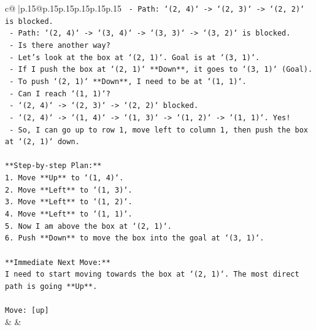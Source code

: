 \documentclass{article}
\begin{document}
{\begin{supertabular}{c@{$\;$}|p{.15\linewidth}@{}p{.15\linewidth}p{.15\linewidth}p{.15\linewidth}p{.15\linewidth}p{.15\linewidth}}
{{{\texttt{    {-} Path: `(2, 4)` {-}> `(2, 3)` {-}> `(2, 2)` is blocked.} \\
\texttt{    {-} Path: `(2, 4)` {-}> `(3, 4)` {-}> `(3, 3)` {-}> `(3, 2)` is blocked.} \\
\texttt{    {-} Is there another way?} \\
\texttt{    {-} Let's look at the box at `(2, 1)`. Goal is at `(3, 1)`.} \\
\texttt{    {-} If I push the box at `(2, 1)` **Down**, it goes to `(3, 1)` (Goal).} \\
\texttt{    {-} To push `(2, 1)` **Down**, I need to be at `(1, 1)`.} \\
\texttt{    {-} Can I reach `(1, 1)`?} \\
\texttt{        {-} `(2, 4)` {-}> `(2, 3)` {-}> `(2, 2)` blocked.} \\
\texttt{        {-} `(2, 4)` {-}> `(1, 4)` {-}> `(1, 3)` {-}> `(1, 2)` {-}> `(1, 1)`. Yes!} \\
\texttt{    {-} So, I can go up to row 1, move left to column 1, then push the box at `(2, 1)` down.} \\
\\ 
\texttt{**Step{-}by{-}step Plan:**} \\
\texttt{1.  Move **Up** to `(1, 4)`.} \\
\texttt{2.  Move **Left** to `(1, 3)`.} \\
\texttt{3.  Move **Left** to `(1, 2)`.} \\
\texttt{4.  Move **Left** to `(1, 1)`.} \\
\texttt{5.  Now I am above the box at `(2, 1)`.} \\
\texttt{6.  Push **Down** to move the box into the goal at `(3, 1)`.} \\
\\ 
\texttt{**Immediate Next Move:**} \\
\texttt{I need to start moving towards the box at `(2, 1)`. The most direct path is going **Up**.} \\
\\ 
\texttt{Move: {[}up{]}} \\
            }
        }
    }
    & & \\ \\


\end{supertabular}}
\end{document}
